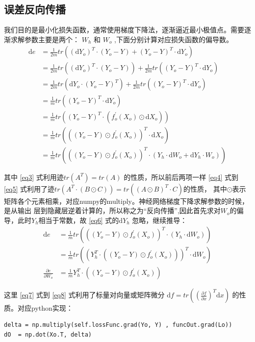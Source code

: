 \documentclass[12pt, a4paper, oneside]{ctexart}
\begin{document}
\subsection{误差反向传播}

我们目的是最小化损失函数，通常使用梯度下降法，逐渐逼近最小极值点。需要逐渐求解参数主要是两个：
$W_h$ 和  $W_o$ ,下面分别计算对应损失函数的偏导数。
\begin{align}
\mathrm{d}e &= \frac{1}{2m}tr((\mathrm{d}Y_o)^T \cdot (Y_o - Y)  +  (Y_o - Y)^T \cdot \mathrm{d}Y_o)  \nonumber\\
	&= \frac{1}{2m}tr((\mathrm{d}Y_o)^T \cdot (Y_o - Y))  +  \frac{1}{2m}tr((Y_o - Y)^T \cdot \mathrm{d}Y_o)  \nonumber\\
	&= \frac{1}{2m}tr(\mathrm{d}Y_o \cdot (Y_o - Y)^T)  +  \frac{1}{2m}tr((Y_o - Y)^T \cdot \mathrm{d}Y_o)  \nonumber\\
	&= \frac{1}{m}tr((Y_o - Y)^T \cdot \mathrm{d}Y_o) \label{eq3} \\
	&= \frac{1}{m}tr((Y_o - Y)^T \cdot (f_o^{'}(X_o) \odot \mathrm{d}X_o)) \label{eq4} \\
	&= \frac{1}{m}tr(((Y_o - Y) \odot f_o^{'}(X_o))^T \cdot \mathrm{d}X_o) \label{eq5} \\
	&= \frac{1}{m}tr(((Y_o - Y) \odot f_o^{'}(X_o))^T \cdot (Y_h \cdot \mathrm{d}W_o + \mathrm{d}Y_h \cdot W_o))  \label{eq6}
\end{align}

其中 \eqref{eq3} 式利用迹$tr(A^T) = tr(A)$ 的性质，所以前后两项一样 \eqref{eq4} 式到
\eqref{eq5} 式利用了迹$tr(A^T \cdot (B \odot C)) = tr((A \odot B)^T \cdot C)$的性质，
其中$\odot$表示矩阵各个元素相乘，对应numpy的multiply。神经网络梯度下降求解参数的时候，是从输出
层到隐藏层逆着计算的，所以称之为“反向传播”,因此首先求对$W_o$的偏导，此时$Y_h$相当于常数，故
\eqref{eq6} 式的$\mathrm{d}Y_h$ 忽略，继续推导：
\begin{align}
\mathrm{d}e &= \frac{1}{m}tr(((Y_o - Y) \odot f_o^{'}(X_o))^T \cdot (Y_h \cdot \mathrm{d}W_o))    \nonumber\\
    &= \frac{1}{m}tr((Y_h^T \cdot ((Y_o - Y) \odot f_o^{'}(X_o)))^T \cdot \mathrm{d}W_o)   \label{eq7} \\
    \frac{\partial e}{\partial W_o} &= \frac{1}{m}Y_h^T \cdot ((Y_o - Y) \odot f_o^{'}(X_o))    \label{eq8}
\end{align}

这里 \eqref{eq7} 式到 \eqref{eq8} 式利用了标量对向量或矩阵微分
$\mathrm{d}f = tr((\frac{\partial f}{\partial x})^T \mathrm{d}x)$ 的性质。对应python实现：
\begin{lstlisting}
delta = np.multiply(self.lossFunc.grad(Yo, Y) , funcOut.grad(Lo))
dO  = np.dot(Xo.T, delta)
\end{lstlisting}
\end{document}
